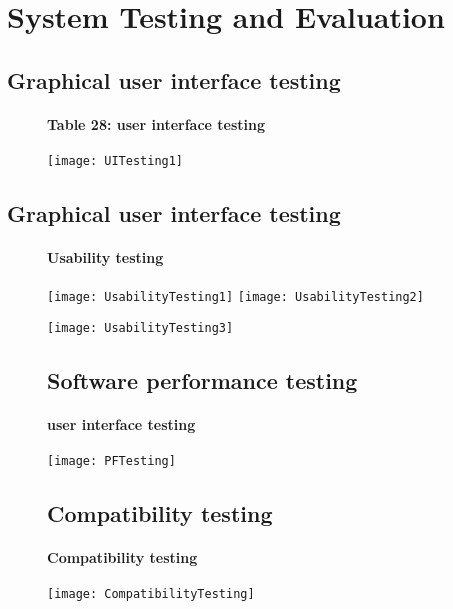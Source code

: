 \chapter{System Testing and Evaluation}\label{chap:testingEvaluation}

\section{Graphical user interface testing}
\begin{figure}[ht]
\subsubsection{Table 28: user interface testing}
\centering
\texttt{[image: UITesting1]}
\end{figure}

\section{Graphical user interface testing}
\begin{figure}[ht]
\subsubsection{Usability testing}
\centering
\texttt{[image: UsabilityTesting1]}
\texttt{[image: UsabilityTesting2]}
\end{figure}

\begin{figure}
\centering
\texttt{[image: UsabilityTesting3]}
\end{figure}

\begin{figure}
\section{Software performance testing}
\subsubsection{user interface testing}
\centering
\texttt{[image: PFTesting]}
\end{figure}

\begin{figure}
\section{Compatibility testing}
\subsubsection{Compatibility testing}
\centering
\texttt{[image: CompatibilityTesting]}
\end{figure}

